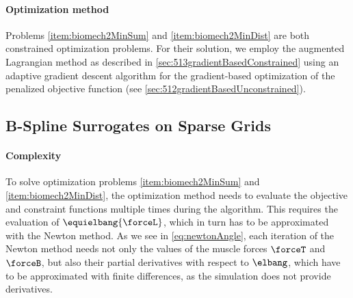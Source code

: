 \paragraph{Optimization method}
%
Problems \ref{item:biomech2MinSum} and \ref{item:biomech2MinDist}
are both constrained optimization problems.
For their solution, we employ the augmented Lagrangian method as
described in \cref{sec:513gradientBasedConstrained}
using an adaptive gradient descent algorithm
for the gradient-based optimization of the penalized objective function
(see \cref{sec:512gradientBasedUnconstrained}).



\subsection{B-Spline Surrogates on Sparse Grids}
\label{sec:723surrogates}

\paragraph{Complexity}

To solve optimization problems
\ref{item:biomech2MinSum} and \ref{item:biomech2MinDist},
the optimization method needs to evaluate the objective
and constraint functions multiple times during the algorithm.
This requires the evaluation of $\equielbang{\forceL}$,
which in turn has to be approximated with the Newton method.
As we see in \cref{eq:newtonAngle},
each iteration of the Newton method needs not only the values of the
muscle forces $\forceT$ and $\forceB$, but also their
partial derivatives with respect to $\elbang$,
which have to be approximated with finite differences,
as the simulation does not provide derivatives.

